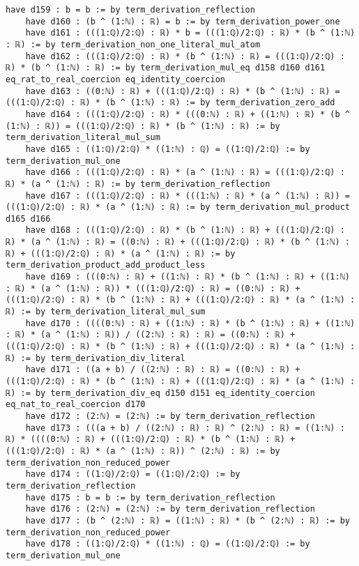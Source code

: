 \documentclass{article}
\begin{document}
\begin{tcolorbox}[colback=white!10, width=\linewidth]
\begin{lstlisting}[language=Lean4]
    have d159 : b = b := by term_derivation_reflection
    have d160 : (b ^ (1:ℕ) : ℝ) = b := by term_derivation_power_one
    have d161 : (((1:ℚ)/2:ℚ) : ℝ) * b = (((1:ℚ)/2:ℚ) : ℝ) * (b ^ (1:ℕ) : ℝ) := by term_derivation_non_one_literal_mul_atom
    have d162 : (((1:ℚ)/2:ℚ) : ℝ) * (b ^ (1:ℕ) : ℝ) = (((1:ℚ)/2:ℚ) : ℝ) * (b ^ (1:ℕ) : ℝ) := by term_derivation_mul_eq d158 d160 d161 eq_rat_to_real_coercion eq_identity_coercion
    have d163 : ((0:ℕ) : ℝ) + (((1:ℚ)/2:ℚ) : ℝ) * (b ^ (1:ℕ) : ℝ) = (((1:ℚ)/2:ℚ) : ℝ) * (b ^ (1:ℕ) : ℝ) := by term_derivation_zero_add
    have d164 : (((1:ℚ)/2:ℚ) : ℝ) * (((0:ℕ) : ℝ) + ((1:ℕ) : ℝ) * (b ^ (1:ℕ) : ℝ)) = (((1:ℚ)/2:ℚ) : ℝ) * (b ^ (1:ℕ) : ℝ) := by term_derivation_literal_mul_sum
    have d165 : ((1:ℚ)/2:ℚ) * ((1:ℕ) : ℚ) = ((1:ℚ)/2:ℚ) := by term_derivation_mul_one
    have d166 : (((1:ℚ)/2:ℚ) : ℝ) * (a ^ (1:ℕ) : ℝ) = (((1:ℚ)/2:ℚ) : ℝ) * (a ^ (1:ℕ) : ℝ) := by term_derivation_reflection
    have d167 : (((1:ℚ)/2:ℚ) : ℝ) * (((1:ℕ) : ℝ) * (a ^ (1:ℕ) : ℝ)) = (((1:ℚ)/2:ℚ) : ℝ) * (a ^ (1:ℕ) : ℝ) := by term_derivation_mul_product d165 d166
    have d168 : (((1:ℚ)/2:ℚ) : ℝ) * (b ^ (1:ℕ) : ℝ) + (((1:ℚ)/2:ℚ) : ℝ) * (a ^ (1:ℕ) : ℝ) = ((0:ℕ) : ℝ) + (((1:ℚ)/2:ℚ) : ℝ) * (b ^ (1:ℕ) : ℝ) + (((1:ℚ)/2:ℚ) : ℝ) * (a ^ (1:ℕ) : ℝ) := by term_derivation_product_add_product_less
    have d169 : (((0:ℕ) : ℝ) + ((1:ℕ) : ℝ) * (b ^ (1:ℕ) : ℝ) + ((1:ℕ) : ℝ) * (a ^ (1:ℕ) : ℝ)) * (((1:ℚ)/2:ℚ) : ℝ) = ((0:ℕ) : ℝ) + (((1:ℚ)/2:ℚ) : ℝ) * (b ^ (1:ℕ) : ℝ) + (((1:ℚ)/2:ℚ) : ℝ) * (a ^ (1:ℕ) : ℝ) := by term_derivation_literal_mul_sum
    have d170 : ((((0:ℕ) : ℝ) + ((1:ℕ) : ℝ) * (b ^ (1:ℕ) : ℝ) + ((1:ℕ) : ℝ) * (a ^ (1:ℕ) : ℝ)) / ((2:ℕ) : ℝ) : ℝ) = ((0:ℕ) : ℝ) + (((1:ℚ)/2:ℚ) : ℝ) * (b ^ (1:ℕ) : ℝ) + (((1:ℚ)/2:ℚ) : ℝ) * (a ^ (1:ℕ) : ℝ) := by term_derivation_div_literal
    have d171 : ((a + b) / ((2:ℕ) : ℝ) : ℝ) = ((0:ℕ) : ℝ) + (((1:ℚ)/2:ℚ) : ℝ) * (b ^ (1:ℕ) : ℝ) + (((1:ℚ)/2:ℚ) : ℝ) * (a ^ (1:ℕ) : ℝ) := by term_derivation_div_eq d150 d151 eq_identity_coercion eq_nat_to_real_coercion d170
    have d172 : (2:ℕ) = (2:ℕ) := by term_derivation_reflection
    have d173 : (((a + b) / ((2:ℕ) : ℝ) : ℝ) ^ (2:ℕ) : ℝ) = ((1:ℕ) : ℝ) * ((((0:ℕ) : ℝ) + (((1:ℚ)/2:ℚ) : ℝ) * (b ^ (1:ℕ) : ℝ) + (((1:ℚ)/2:ℚ) : ℝ) * (a ^ (1:ℕ) : ℝ)) ^ (2:ℕ) : ℝ) := by term_derivation_non_reduced_power
    have d174 : ((1:ℚ)/2:ℚ) = ((1:ℚ)/2:ℚ) := by term_derivation_reflection
    have d175 : b = b := by term_derivation_reflection
    have d176 : (2:ℕ) = (2:ℕ) := by term_derivation_reflection
    have d177 : (b ^ (2:ℕ) : ℝ) = ((1:ℕ) : ℝ) * (b ^ (2:ℕ) : ℝ) := by term_derivation_non_reduced_power
    have d178 : ((1:ℚ)/2:ℚ) * ((1:ℕ) : ℚ) = ((1:ℚ)/2:ℚ) := by term_derivation_mul_one

\end{lstlisting}
\end{tcolorbox}
\end{document}
